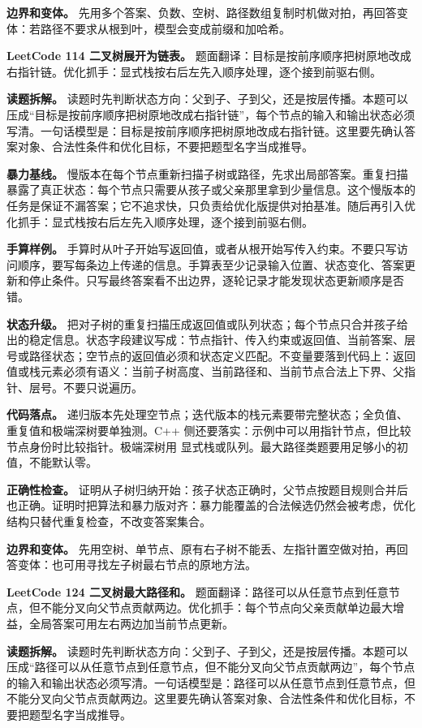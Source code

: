 \textbf{边界和变体。} 先用多个答案、负数、空树、路径数组复制时机做对拍，再回答变体：若路径不要求从根到叶，模型会变成前缀和加哈希。

\noindent\textbf{LeetCode 114 二叉树展开为链表。} 题面翻译：目标是按前序顺序把树原地改成右指针链。优化抓手：显式栈按右后左先入顺序处理，逐个接到前驱右侧。

\textbf{读题拆解。} 读题时先判断状态方向：父到子、子到父，还是按层传播。本题可以压成“目标是按前序顺序把树原地改成右指针链”，每个节点的输入和输出状态必须写清。一句话模型是：目标是按前序顺序把树原地改成右指针链。这里要先确认答案对象、合法性条件和优化目标，不要把题型名字当成推导。

\textbf{暴力基线。} 慢版本在每个节点重新扫描子树或路径，先求出局部答案。重复扫描暴露了真正状态：每个节点只需要从孩子或父亲那里拿到少量信息。这个慢版本的任务是保证不漏答案；它不追求快，只负责给优化版提供对拍基准。随后再引入优化抓手：显式栈按右后左先入顺序处理，逐个接到前驱右侧。

\textbf{手算样例。} 手算时从叶子开始写返回值，或者从根开始写传入约束。不要只写访问顺序，要写每条边上传递的信息。手算表至少记录输入位置、状态变化、答案更新和停止条件。只写最终答案看不出边界，逐轮记录才能发现状态更新顺序是否错。

\textbf{状态升级。} 把对子树的重复扫描压成返回值或队列状态；每个节点只合并孩子给出的稳定信息。状态字段建议写成：节点指针、传入约束或返回值、当前答案、层号或路径状态；空节点的返回值必须和状态定义匹配。不变量要落到代码上：返回值或栈元素必须有语义：当前子树高度、当前路径和、当前节点合法上下界、父指针、层号。不要只说遍历。

\textbf{代码落点。} 递归版本先处理空节点；迭代版本的栈元素要带完整状态；全负值、重复值和极端深树要单独测。C++ 侧还要落实：示例中可以用指针节点，但比较节点身份时比较指针。极端深树用  显式栈或队列。最大路径类题要用足够小的初值，不能默认零。

\textbf{正确性检查。} 证明从子树归纳开始：孩子状态正确时，父节点按题目规则合并后也正确。证明时把算法和暴力版对齐：暴力能覆盖的合法候选仍然会被考虑，优化结构只替代重复检查，不改变答案集合。

\textbf{边界和变体。} 先用空树、单节点、原有右子树不能丢、左指针置空做对拍，再回答变体：也可用寻找左子树最右节点的原地方法。

\noindent\textbf{LeetCode 124 二叉树最大路径和。} 题面翻译：路径可以从任意节点到任意节点，但不能分叉向父节点贡献两边。优化抓手：每个节点向父亲贡献单边最大增益，全局答案可用左右两边加当前节点更新。

\textbf{读题拆解。} 读题时先判断状态方向：父到子、子到父，还是按层传播。本题可以压成“路径可以从任意节点到任意节点，但不能分叉向父节点贡献两边”，每个节点的输入和输出状态必须写清。一句话模型是：路径可以从任意节点到任意节点，但不能分叉向父节点贡献两边。这里要先确认答案对象、合法性条件和优化目标，不要把题型名字当成推导。

